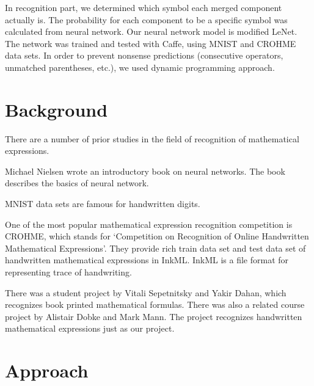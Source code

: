 \documentclass[10pt,twocolumn,letterpaper]{article}
\begin{document}
In recognition part, we determined which symbol each merged component actually is. The probability for each component to be a specific symbol was calculated from neural network. Our neural network model is modified LeNet\cite{LeNet}. The network was trained and tested with Caffe, using MNIST\cite{MNIST} and CROHME\cite{CROHME} data sets. In order to prevent nonsense predictions (consecutive operators, unmatched parentheses, etc.), we used dynamic programming approach.


\section{Background}

There are a number of prior studies in the field of recognition of mathematical expressions.

Michael Nielsen\cite{MichaelNielsen} wrote an introductory book on neural networks.
The book describes the basics of neural network.

MNIST\cite{MNIST} data sets are famous for handwritten digits.

One of the most popular mathematical expression recognition competition is CROHME,
which stands for
`Competition on Recognition of Online Handwritten Mathematical Expressions'\cite{CROHME}.
They provide rich train data set and test data set of handwritten mathematical expressions
in InkML. InkML is a file format for representing trace of handwriting.


There was a student project by Vitali Sepetnitsky and Yakir Dahan\cite{OCRMATH}, which recognizes book printed mathematical formulas.
There was also a related course project by Alistair Dobke and Mark Mann\cite{OCRMATH2}. The project recognizes handwritten mathematical expressions just as our project.



\section{Approach}
\end{document}
